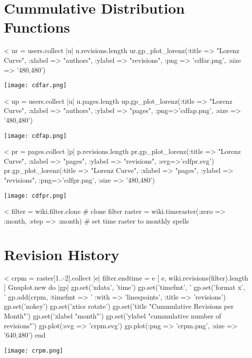 \documentclass{scrartcl}
\begin{document}




\section{Cummulative Distribution Functions} %
\label{sec:cummulative_distribution_functions}

<%
ur = users.collect { |u| u.revisions.length }
ur.gp_plot_lorenz(:title => "Lorenz Curve", :xlabel => "authors",
 :ylabel => "revisions", :png => 'cdfar.png', :size => '480,480')
\begin{center}
  \texttt{[image: cdfar.png]}
\end{center}

<%
up = users.collect { |u| u.pages.length }
up.gp_plot_lorenz(:title => "Lorenz Curve", :xlabel => "authors", :ylabel => "pages", :png=>'cdfap.png', :size => '480,480')
\begin{center}
  \texttt{[image: cdfap.png]}
\end{center}

<%
pr = pages.collect { |p| p.revisions.length }
pr.gp_plot_lorenz(:title => "Lorenz Curve", :xlabel => "pages", :ylabel => "revisions", :svg=>'cdfpr.svg')
pr.gp_plot_lorenz(:title => "Lorenz Curve", :xlabel => "pages", :ylabel => "revisions", :png=>'cdfpr.png', :size => '480,480')
\begin{center}
  \texttt{[image: cdfpr.png]}
\end{center}



<%
filter = wiki.filter.clone # clone filter
raster = wiki.timeraster(:zero => :month, :step => :month) # set time raster to monthly spells

\section{Revision History} %
\label{sec:revision_history}

<%
crpm = raster[1..-2].collect { |e| filter.endtime = e 
	[ e, wiki.revisions(filter).length ]
	}
Gnuplot.new do |gp|
	gp.set('xdata', 'time')
	gp.set('timefmt', '%
	gp.set('format x', '%
	gp.add(crpm, :timefmt => '%
		:with => 'linespoints', 
		:title => 'revisions')
	gp.set('nokey')
	gp.set('xtics rotate')
	gp.set('title "Cummulative Revisions per Month"')
	gp.set('xlabel "month"')
	gp.set('ylabel "cummulative number of revisions"')
	gp.plot(:svg => 'crpm.svg')
	gp.plot(:png => 'crpm.png', :size => '640,480')
end
\begin{center}
  \texttt{[image: crpm.png]}
\end{center}
\end{document}
